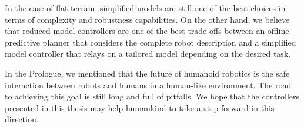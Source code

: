 In the case of flat terrain, simplified models are still one of the best choices in terms of complexity and robustness capabilities. On the other hand, we believe that reduced model controllers are one of the best trade-offs between an offline predictive planner that considers the complete robot description and a simplified model controller that relays on a tailored model depending on the desired task.
\par
In the Prologue, we mentioned that the future of humanoid robotics is the safe interaction between robots and humans in a human-like environment. The road to achieving this goal is still long and full of pitfalls.
We hope that the controllers presented in this thesis may help humankind to take a step forward in this direction.